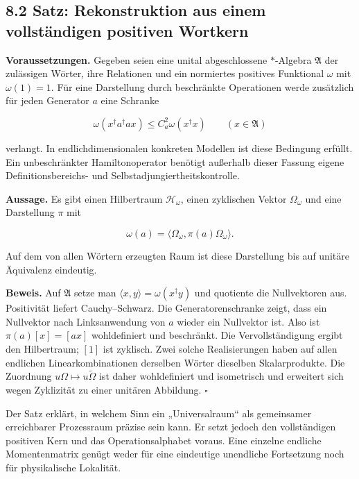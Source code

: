 \subsection{8.2 Satz: Rekonstruktion aus einem vollständigen positiven
Wortkern}\label{satz-rekonstruktion-aus-einem-vollstuxe4ndigen-positiven-wortkern}

\textbf{Voraussetzungen.} Gegeben seien eine unital abgeschlossene
\(*\)-Algebra \(\mathfrak A\) der zulässigen Wörter, ihre Relationen und
ein normiertes positives Funktional \(\omega\) mit \(\omega(1)=1\). Für
eine Darstellung durch beschränkte Operationen werde zusätzlich für
jeden Generator \(a\) eine Schranke

\[\omega(x^\dagger a^\dagger ax)\le C_a^2\omega(x^\dagger x)
\qquad(x\in\mathfrak A)\]

verlangt. In endlichdimensionalen konkreten Modellen ist diese Bedingung
erfüllt. Ein unbeschränkter Hamiltonoperator benötigt außerhalb dieser
Fassung eigene Definitionsbereichs- und Selbstadjungiertheitskontrolle.

\textbf{Aussage.} Es gibt einen Hilbertraum \(\mathcal H_\omega\), einen
zyklischen Vektor \(\Omega_\omega\) und eine Darstellung \(\pi\) mit

\[\omega(a)=\langle\Omega_\omega,\pi(a)\Omega_\omega\rangle.\]

Auf dem von allen Wörtern erzeugten Raum ist diese Darstellung bis auf
unitäre Äquivalenz eindeutig.

\textbf{Beweis.} Auf \(\mathfrak A\) setze man
\(\langle x,y\rangle=\omega(x^\dagger y)\) und quotiente die
Nullvektoren aus. Positivität liefert Cauchy--Schwarz. Die
Generatorenschranke zeigt, dass ein Nullvektor nach Linksanwendung von
\(a\) wieder ein Nullvektor ist. Also ist \(\pi(a)[x]=[ax]\)
wohldefiniert und beschränkt. Die Vervollständigung ergibt den
Hilbertraum; \([1]\) ist zyklisch. Zwei solche Realisierungen haben auf
allen endlichen Linearkombinationen derselben Wörter dieselben
Skalarprodukte. Die Zuordnung \(u\Omega\mapsto u\widetilde\Omega\) ist
daher wohldefiniert und isometrisch und erweitert sich wegen Zyklizität
zu einer unitären Abbildung. \(\square\)

Der Satz erklärt, in welchem Sinn ein „Universalraum`` als gemeinsamer
erreichbarer Prozessraum präzise sein kann. Er setzt jedoch den
vollständigen positiven Kern und das Operationsalphabet voraus. Eine
einzelne endliche Momentenmatrix genügt weder für eine eindeutige
unendliche Fortsetzung noch für physikalische Lokalität.

